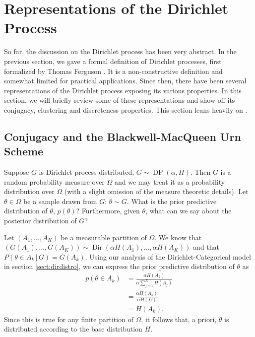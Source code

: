 \documentclass[final,3p,times,twocolumn]{elsarticle}
\DeclareMathOperator*{\Dir}{Dir}
\DeclareMathOperator*{\DP}{DP}
\begin{document}
\section{Representations of the Dirichlet Process}
\label{sect:representations}
So far, the discussion on the Dirichlet process has been very abstract.
In the previous section, we gave a formal definition of Dirichlet processes, first formalized by Thomas Ferguson \cite{ferguson1973}.
It is a non-constructive definition and somewhat limited for practical applications.
Since then, there have been several representations of the Dirichlet process exposing its various properties.
In this section, we will briefly review some of these representations and show off its conjugacy, clustering and discreteness properties.
This section leans heavily on \cite{Teh2010a}.

\subsection{Conjugacy and the Blackwell-MacQueen Urn Scheme}
Suppose $G$ is Dirichlet process distributed, $G \sim \DP(\alpha,H)$.
Then $G$ is a random probability measure over $\Omega$ and we may treat it as a probability distribution over $\Omega$ (with a slight omission of the measure theoretic details).
Let $\theta \in \Omega$ be a sample drawn from $G$: $\theta \sim G$.
What is the prior predictive distribution of $\theta$, $p(\theta)$? Furthermore, given $\theta$, what can we say about the posterior distribution of $G$?

Let $(A_1,\dots,A_K)$ be a measurable partition of $\Omega$. 
We know that $(G(A_1),\dots,G(A_K))\sim \Dir(\alpha H(A_1),\dots,\alpha H(A_K))$ and that $P(\theta \in A_k \,|\, G) = G(A_k)$.
Using our analysis of the Dirichlet-Categorical model in section \ref{sect:dirdistro}, we can express the prior predictive distribution of $\theta$ as
\begin{equation*}
\begin{split}
p(\theta \in A_k) &= \frac{\alpha H(A_k)}{\alpha \sum_{j=1}^K H(A_j)}\\
&= \frac{\alpha H(A_k)}{\alpha H(\Omega)}\\
&= H(A_k).
\end{split}
\end{equation*}
Since this is true for any finite partition of $\Omega$, it follows that, a priori, $\theta$ is distributed according to the base distribution $H$.
\end{document}
